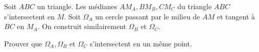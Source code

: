 Soit $ABC$ un triangle. Les médianes $AM_A, BM_B, CM_C$ du triangle $ABC$ s'intersectent en $M$. Soit $\Omega_A$ un cercle passant par le milieu de $AM$ et tangent à $BC$ en $M_A$. On construit similairement $\Omega_B$ et $\Omega_C$.

Prouver que $\Omega_A, \Omega_B$ et $\Omega_C$ s'intersectent en un même point.